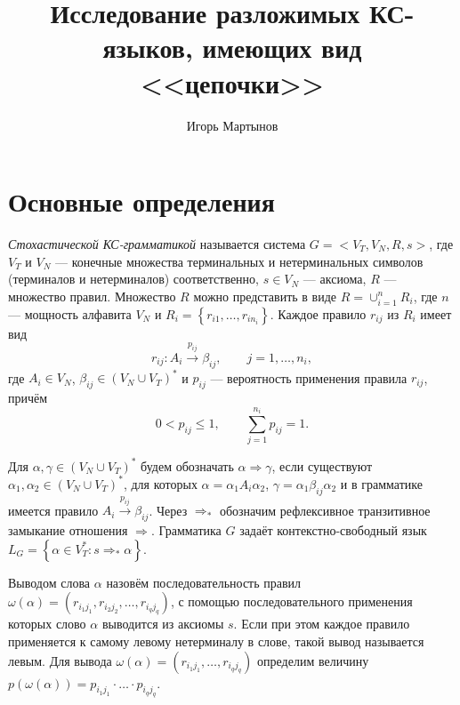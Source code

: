\documentclass[12pt]{article}
\title{Исследование разложимых КС-языков, имеющих вид <<цепочки>>}
\author{Игорь Мартынов}
\renewcommand{\leq}{\leqslant}
\begin{document}
\clearpage
\setlength{\parindent}{0pt}
\setlength{\parskip}{8pt}


\section{Основные определения}

\textit{Стохастической КС-грамматикой} \cite{fu-struct} называется система $G = <V_T, V_N, R, s>$, где $V_T$ и $V_N$ --- конечные множества терминальных и нетерминальных символов (терминалов и нетерминалов) соответственно, $s \in V_N$ --- аксиома, $R$ --- множество правил. Множество $R$ можно представить в виде $R = \cup_{i = 1}^n R_i$, где $n$ --- мощность алфавита $V_N$ и $R_i = \left\{r_{i1}, \ldots, r_{i n_i}\right\}$. Каждое правило $r_{ij}$ из $R_i$ имеет вид
\begin{equation}
	r_{ij} : A_i \xrightarrow{p_{ij}} \beta_{ij},\qquad j = 1, \ldots, n_i,
\end{equation}
где $A_i \in V_N$, $\beta_{ij} \in (V_N \cup V_T)^*$ и $p_{ij}$ --- вероятность применения правила $r_{ij}$, причём
\begin{equation}
\label{eq:p_values}
	0 < p_{ij} \leq 1,\qquad \sum_{j = 1}^{n_i} p_{ij} = 1.
\end{equation}

Для $\alpha, \gamma \in (V_N \cup V_T)^*$ будем обозначать $\alpha \Rightarrow \gamma$, если существуют $\alpha_1, \alpha_2 \in (V_N \cup V_T)^*$, для которых $\alpha = \alpha_1 A_i \alpha_2$, $\gamma = \alpha_1 \beta_{ij} \alpha_2$ и в грамматике имеется правило $A_i \xrightarrow{p_{ij}} \beta_{ij}$. Через $\Rightarrow_*$ обозначим рефлексивное транзитивное замыкание отношения $\Rightarrow$. Грамматика $G$ задаёт контекстно-свободный язык $L_G = \left\{ \alpha \in V_T^* : s \Rightarrow_* \alpha\right\}$.

Выводом слова $\alpha$ назовём последовательность правил $\omega(\alpha) = (r_{i_1 j_1}, r_{i_2 j_2}, \ldots, r_{i_q j_q})$, с помощью последовательного применения которых слово $\alpha$ выводится из аксиомы $s$. Если при этом каждое правило применяется к самому левому нетерминалу в слове, такой вывод называется левым. Для вывода $\omega(\alpha) = (r_{i_1 j_1}, \ldots, r_{i_q j_q})$ определим величину $p(\omega(\alpha)) = p_{i_1 j_1} \cdot \ldots \cdot p_{i_q j_q}$.
\end{document}
